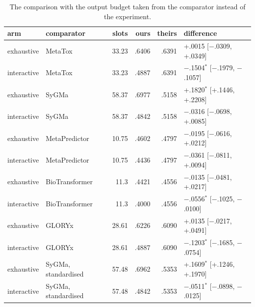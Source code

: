 \begin{table}[t]
\centering\small
\begin{threeparttable}
\caption{The comparison with the output budget taken from the comparator instead of the experiment.}
\label{tab:si-matched}
\begin{tabular}{llrrrl}
\toprule
arm & comparator & slots & ours & theirs & difference \\
\midrule
exhaustive & MetaTox & 33.23 & .6406 & .6391 & +.0015 [$-$.0309, +.0349] \\
interactive & MetaTox & 33.23 & .4887 & .6391 & $-$.1504$^{*}$ [$-$.1979, $-$.1057] \\
exhaustive & SyGMa & 58.37 & .6977 & .5158 & +.1820$^{*}$ [+.1446, +.2208] \\
interactive & SyGMa & 58.37 & .4842 & .5158 & $-$.0316 [$-$.0698, +.0085] \\
exhaustive & MetaPredictor & 10.75 & .4602 & .4797 & $-$.0195 [$-$.0616, +.0212] \\
interactive & MetaPredictor & 10.75 & .4436 & .4797 & $-$.0361 [$-$.0811, +.0094] \\
exhaustive & BioTransformer & 11.3 & .4421 & .4556 & $-$.0135 [$-$.0481, +.0217] \\
interactive & BioTransformer & 11.3 & .4000 & .4556 & $-$.0556$^{*}$ [$-$.1025, $-$.0100] \\
exhaustive & GLORYx & 28.61 & .6226 & .6090 & +.0135 [$-$.0217, +.0491] \\
interactive & GLORYx & 28.61 & .4887 & .6090 & $-$.1203$^{*}$ [$-$.1685, $-$.0754] \\
exhaustive & SyGMa, standardised & 57.48 & .6962 & .5353 & +.1609$^{*}$ [+.1246, +.1970] \\
interactive & SyGMa, standardised & 57.48 & .4842 & .5353 & $-$.0511$^{*}$ [$-$.0898, $-$.0125] \\
\bottomrule
\end{tabular}
\begin{tablenotes}[flushleft]\footnotesize

\end{tablenotes}
\end{threeparttable}
\end{table}
